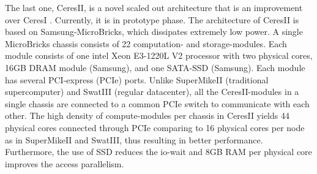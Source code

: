 \documentclass[conference]{IEEEtran}
\begin{document}
The last one, CeresII, is a novel scaled out architecture that is an improvement over CeresI \cite{Cluster:ceres1}. 
Currently, it is in prototype phase. 
The architecture of CeresII is based on Samsung-MicroBricks, which dissipates extremely low power. 
A single MicroBricks chassis consists of 22 computation- and storage-modules. 
Each module consists of one intel Xeon E3-1220L V2 processor with two physical cores, 16GB DRAM module (Samsung), and  one SATA-SSD (Samsung).
Each module has several PCI-express (PCIe) ports. 
Unlike SuperMikeII (traditional supercomputer) and SwatIII (regular datacenter), all the CeresII-modules in a single chassis are connected to a common PCIe switch to communicate with each other. 
The high density of compute-modules per chassis in CeresII yields 44 physical cores connected through PCIe comparing to 16 physical cores per node as in SuperMikeII and SwatIII, thus resulting in better performance.
Furthermore, the use of SSD reduces the io-wait and 8GB RAM per physical core improves the access parallelism. 

\end{document}
